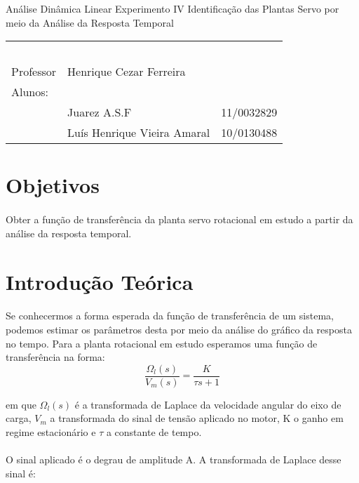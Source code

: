 \documentclass[a4paper,11pt]{article}
\begin{document}
\MakeMyTitlePage
{Análise Dinâmica Linear}
{Experimento IV}
{Identificação das Plantas Servo por meio
da Análise da Resposta Temporal}
{%
		\begin{tabular}{llr} \
		& & \\[0.05cm]		
		Professor & Henrique Cezar Ferreira & \\
		
		Alunos:& & \\
		& Juarez A.S.F 												& 11/0032829\\
		& Luís Henrique Vieira Amaral						&	10/0130488 	
			\end{tabular}
}

\section{Objetivos}
\paragraph{} Obter a função de transferência da planta servo rotacional em estudo
a partir da análise da resposta temporal.
\section{Introdução Teórica}
\paragraph{} Se conhecermos a forma esperada da função de transferência
de um sistema, podemos estimar os parâmetros desta por meio da análise
do gráfico da resposta no tempo. Para a planta rotacional em estudo
esperamos uma função
de transferência na forma:
\begin{equation}
 \frac{\Omega _l (s)}{V_m(s)} = \frac{K}{\tau s + 1}
\end{equation}

em que $\Omega_l(s)$ é a transformada de Laplace da velocidade 
angular do eixo de carga, $V_m$ a transformada do sinal de tensão 
aplicado no motor, K o ganho em regime estacionário e $\tau$ a 
constante de tempo. 

\paragraph{} O sinal aplicado é o degrau de amplitude A. A 
transformada de Laplace desse sinal é:
\end{document}
